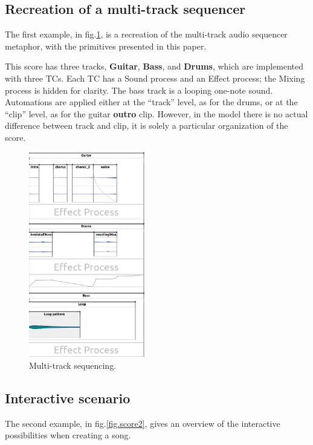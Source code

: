 \documentclass{article}
\newcommand*{\timeconstraint}{\ac{TC}\xspace}
\newcommand*{\timeconstraints}{\acp{TC}\xspace}
\begin{document}
\subsection{Recreation of a multi-track sequencer}
The first example, in fig.\ref{fig.score1}, is a recreation of the multi-track audio sequencer metaphor, with the primitives presented in this paper.
 
This score has three tracks, \textbf{Guitar}, \textbf{Bass}, and \textbf{Drums}, which are implemented with three \timeconstraints.
Each \timeconstraint has a Sound process and an Effect process; the Mixing process is hidden for clarity.
The bass track is a looping one-note sound. Automations are applied either at the ``track'' level, as for the drums, or at the ``clip'' level, as for the guitar \textbf{outro} clip. 
However, in the model there is no actual difference between track and clip, it is solely a particular organization of the score.
 
\begin{figure}[h]
    \centering
    \includegraphics[width=0.45\textwidth]{figures/ex1.png}
    \caption{Multi-track sequencing.}
    \label{fig.score1}
\end{figure}

\subsection{Interactive scenario}
The second example, in fig.\ref{fig.score2}, gives an overview of the interactive possibilities when creating a song.
\end{document}
